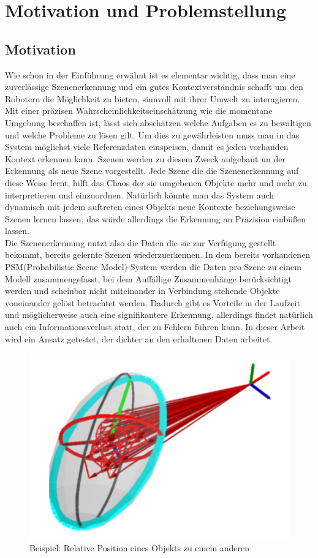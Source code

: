 \chapter{Motivation und Problemstellung}\label{ch:motivation}

\section{Motivation}
Wie schon in der Einführung erwähnt ist es elementar wichtig, dass man eine zuverlässige Szenenerkennung und ein gutes Kontextverständnis schafft um den Robotern die Möglichkeit zu bieten, sinnvoll mit ihrer Umwelt zu interagieren. Mit einer präzisen Wahrscheinlichkeitseinschätzung wie die momentane Umgebung beschaffen ist, lässt sich abschätzen welche Aufgaben es zu bewältigen und welche Probleme zu lösen gilt. Um dies zu gewährleisten muss man in das System möglichst viele Referenzdaten einspeisen, damit es jeden vorhanden Kontext erkennen kann. Szenen werden zu diesem Zweck aufgebaut un der Erkennung als neue Szene vorgestellt. Jede Szene die die Szenenerkennung auf diese Weise lernt, hilft das Chaos der sie umgebenen Objekte mehr und mehr zu interpretieren und einzuordnen. Natürlich könnte man das System auch dynamisch mit jedem auftreten eines Objekts neue Kontexte beziehungsweise Szenen lernen lassen, das würde allerdings die Erkennung an Präzision einbüßen lassen.\\
Die Szenenerkennung nutzt also die Daten die sie zur Verfügung gestellt bekommt, bereits gelernte Szenen wiederzuerkennen. In dem bereits vorhandenen PSM(Probabilistic Scene Model)-System werden die Daten pro Szene zu einem Modell zusammengefasst, bei dem Auffällige Zusammenhänge berücksichtigt werden und scheinbar nicht miteinander in Verbindung stehende Objekte voneinander gelöst betrachtet werden. Dadurch gibt es Vorteile in der Laufzeit und möglicherweise auch eine signifikantere Erkennung, allerdings findet natürlich auch ein Informationsverlust statt, der zu Fehlern führen kann. In dieser Arbeit wird ein Ansatz getestet, der dichter an den erhaltenen Daten arbeitet.

\begin{figure}
	\centering
	\includegraphics{bilder/relation.pdf}
	\caption{Beispiel: Relative Position eines Objekts zu einem anderen}
	\label{img:Relation}
\end{figure}

